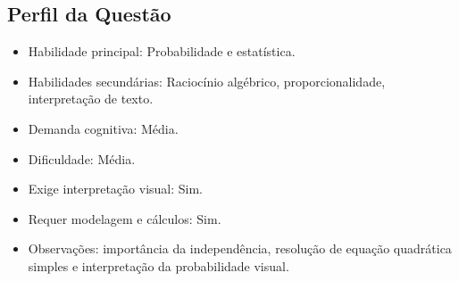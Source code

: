 \documentclass{article}
\begin{document}
\subsection*{Perfil da Questão}
\begin{itemize}
  \item Habilidade principal: Probabilidade e estatística.
  \item Habilidades secundárias: Raciocínio algébrico, proporcionalidade, interpretação de texto.
  \item Demanda cognitiva: Média.
  \item Dificuldade: Média.
  \item Exige interpretação visual: Sim.
  \item Requer modelagem e cálculos: Sim.
  \item Observações: importância da independência, resolução de equação quadrática simples e interpretação da probabilidade visual.
\end{itemize}
\end{document}
